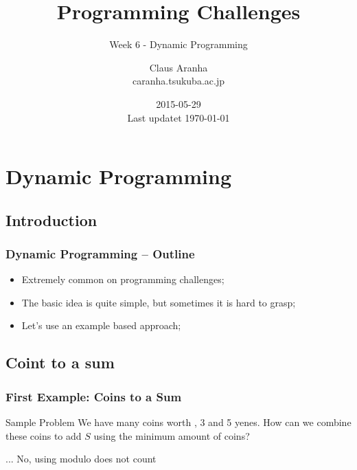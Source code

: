 \documentclass{beamer}
\title[]{Programming Challenges}
\subtitle[]{Week 6 - Dynamic Programming}
\author[Claus Aranha]{Claus Aranha\\{\footnotesize caranha\@@cs.tsukuba.ac.jp}}
\institute{College of Information Siences}
\date{2015-05-29\\{\tiny Last updatet \today}}
\begin{document}
\begin{frame}
\maketitle
\end{frame}

\section{Dynamic Programming}
\subsection{Introduction}

\begin{frame}
  \frametitle{Dynamic Programming -- Outline}
  \begin{block}{}
    \begin{itemize}
    \item Extremely common on programming challenges;
    \item The basic idea is quite simple, but sometimes it is hard to
      grasp;
    \item Let's use an example based approach;
    \end{itemize}
  \end{block}
\end{frame}

\subsection{Coint to a sum}

\begin{frame}
  \frametitle{First Example: Coins to a Sum}
  \begin{block}{Sample Problem}
    We have many coins worth , {3} and {5} yenes. How can
    we combine these coins to add $S$ using the minimum amount of
    coins?
  \end{block}
  \medskip
  {\small ... No, using modulo does not count}
\end{frame}
\end{document}
